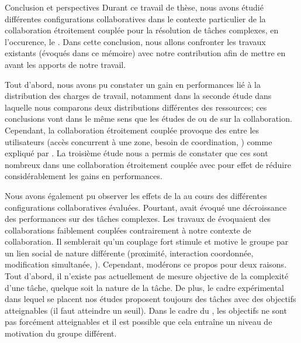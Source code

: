 \documentclass[myfrancais,ngerman,english,french]{mythesis}
\begin{document}
	\begin{mychapter+}{Conclusion et perspectives}
		Durant ce travail de thèse, nous avons étudié différentes configurations collaboratives dans le contexte particulier de la collaboration étroitement couplée pour la résolution de tâches complexes, en l'occurence, le .
		Dans cette conclusion, nous allons confronter les travaux existants (évoqués dans ce mémoire) avec notre contribution afin de mettre en avant les apports de notre travail.

		Tout d'abord, nous avons pu constater un gain en performances lié à la distribution des charges de travail, notamment dans la seconde étude  dans laquelle nous comparons deux distributions différentes des ressources; ces conclusions vont dans le même sens que les études de  ou de  sur la collaboration.
		Cependant, la collaboration étroitement couplée provoque des  entre les utilisateurs (accès concurrent à une zone, besoin de coordination, \myetc) comme expliqué par .
		La troisième étude nous a permis de constater que ces  sont nombreux dans une collaboration étroitement couplée avec pour effet de réduire considérablement les gains en performances.

		Nous avons également pu observer les effets de la  au cours des différentes configurations collaboratives évaluées.
		Pourtant,  avait évoqué une décroissance des performances sur des tâches complexes.
		Les travaux de  évoquaient des collaborations faiblement couplées contrairement à notre contexte de collaboration.
		Il semblerait qu'un couplage fort stimule et motive le groupe par un lien social de nature différente (proximité, interaction coordonnée, modification simultanée, \myetc).
		Cependant, modérons ce propos pour deux raisons.
		Tout d'abord, il n'existe pas actuellement de mesure objective de la complexité d'une tâche, quelque soit la nature de la tâche.
		De plus, le cadre expérimental dans lequel se placent nos études proposent toujours des tâches avec des objectifs atteignables (il faut atteindre un seuil).
		Dans le cadre du , les objectifs ne sont pas forcément atteignables et il est possible que cela entraîne un niveau de motivation du groupe différent.


\end{mychapter+}
\end{document}
